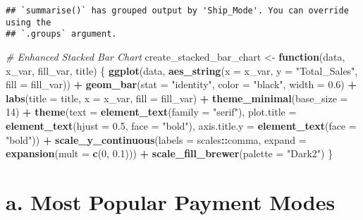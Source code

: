 \documentclass[
]{article}
\newenvironment{Shaded}{\begin{snugshade}}{\end{snugshade}}
\newcommand{\AttributeTok}[1]{\textcolor[rgb]{0.13,0.29,0.53}{#1}}
\newcommand{\CommentTok}[1]{\textcolor[rgb]{0.56,0.35,0.01}{\textit{#1}}}
\newcommand{\ControlFlowTok}[1]{\textcolor[rgb]{0.13,0.29,0.53}{\textbf{#1}}}
\newcommand{\DecValTok}[1]{\textcolor[rgb]{0.00,0.00,0.81}{#1}}
\newcommand{\FloatTok}[1]{\textcolor[rgb]{0.00,0.00,0.81}{#1}}
\newcommand{\FunctionTok}[1]{\textcolor[rgb]{0.13,0.29,0.53}{\textbf{#1}}}
\newcommand{\NormalTok}[1]{#1}
\newcommand{\OtherTok}[1]{\textcolor[rgb]{0.56,0.35,0.01}{#1}}
\newcommand{\SpecialCharTok}[1]{\textcolor[rgb]{0.81,0.36,0.00}{\textbf{#1}}}
\newcommand{\StringTok}[1]{\textcolor[rgb]{0.31,0.60,0.02}{#1}}
\begin{document}
\begin{verbatim}
## `summarise()` has grouped output by 'Ship_Mode'. You can override using the
## `.groups` argument.
\end{verbatim}

\begin{Shaded}
\begin{Highlighting}[]
\CommentTok{\# Enhanced Stacked Bar Chart}
\NormalTok{create\_stacked\_bar\_chart }\OtherTok{\textless{}{-}} \ControlFlowTok{function}\NormalTok{(data, x\_var, fill\_var, title) \{}
  \FunctionTok{ggplot}\NormalTok{(data, }\FunctionTok{aes\_string}\NormalTok{(}\AttributeTok{x =}\NormalTok{ x\_var, }\AttributeTok{y =} \StringTok{"Total\_Sales"}\NormalTok{, }\AttributeTok{fill =}\NormalTok{ fill\_var)) }\SpecialCharTok{+} 
    \FunctionTok{geom\_bar}\NormalTok{(}\AttributeTok{stat =} \StringTok{"identity"}\NormalTok{, }\AttributeTok{color =} \StringTok{"black"}\NormalTok{, }\AttributeTok{width =} \FloatTok{0.6}\NormalTok{) }\SpecialCharTok{+} 
    \FunctionTok{labs}\NormalTok{(}\AttributeTok{title =}\NormalTok{ title, }\AttributeTok{x =}\NormalTok{ x\_var, }\AttributeTok{fill =}\NormalTok{ fill\_var) }\SpecialCharTok{+} 
    \FunctionTok{theme\_minimal}\NormalTok{(}\AttributeTok{base\_size =} \DecValTok{14}\NormalTok{) }\SpecialCharTok{+}
    \FunctionTok{theme}\NormalTok{(}\AttributeTok{text =} \FunctionTok{element\_text}\NormalTok{(}\AttributeTok{family =} \StringTok{"serif"}\NormalTok{),}
          \AttributeTok{plot.title =} \FunctionTok{element\_text}\NormalTok{(}\AttributeTok{hjust =} \FloatTok{0.5}\NormalTok{, }\AttributeTok{face =} \StringTok{"bold"}\NormalTok{),}
          \AttributeTok{axis.title.y =} \FunctionTok{element\_text}\NormalTok{(}\AttributeTok{face =} \StringTok{"bold"}\NormalTok{)) }\SpecialCharTok{+}
    \FunctionTok{scale\_y\_continuous}\NormalTok{(}\AttributeTok{labels =}\NormalTok{ scales}\SpecialCharTok{::}\NormalTok{comma, }\AttributeTok{expand =} \FunctionTok{expansion}\NormalTok{(}\AttributeTok{mult =} \FunctionTok{c}\NormalTok{(}\DecValTok{0}\NormalTok{, }\FloatTok{0.1}\NormalTok{))) }\SpecialCharTok{+}
    \FunctionTok{scale\_fill\_brewer}\NormalTok{(}\AttributeTok{palette =} \StringTok{"Dark2"}\NormalTok{)}
\NormalTok{\}}
\end{Highlighting}
\end{Shaded}

\hypertarget{a.-most-popular-payment-modes}{%
\section{a. Most Popular Payment
Modes}\label{a.-most-popular-payment-modes}}
\end{document}
